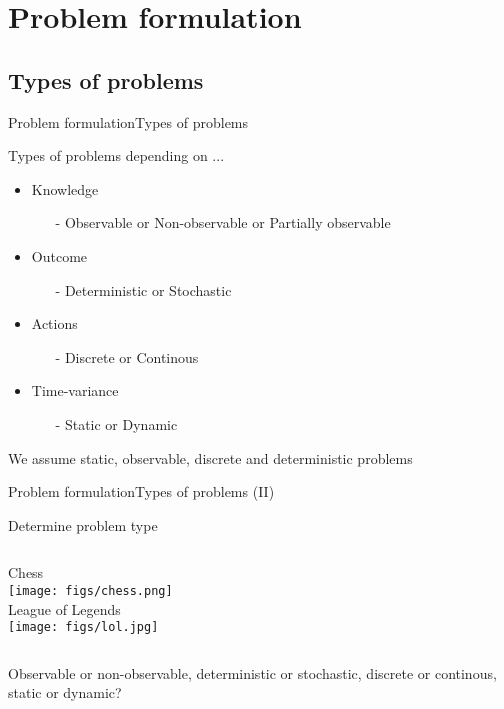 \documentclass[10pt,compress]{beamer} %
\begin{document}
\section{Problem formulation}
\subsection{Types of problems}
\begin{frame}{Problem formulation}{Types of problems}

    Types of problems depending on ...
	\begin{itemize}
        \item Knowledge
            \begin{itemize}
                \item[-] Observable or Non-observable or Partially observable
            \end{itemize}
        \item Outcome
            \begin{itemize}
                \item[-] Deterministic or Stochastic
            \end{itemize}
        \item Actions
            \begin{itemize}
                \item[-] Discrete or Continous
            \end{itemize}
        \item Time-variance
            \begin{itemize}
                \item[-] Static or Dynamic
            \end{itemize}
	\end{itemize}
    We assume static, observable, discrete and deterministic problems
\end{frame}

\begin{frame}[fragile]{Problem formulation}{Types of problems (II)}
    \begin{exampleblock}{Determine problem type}
       \begin{columns}
           \centering Chess\\
           \medskip
	        \texttt{[image: figs/chess.png]}\\

           \centering League of Legends\\
           \medskip
	        \texttt{[image: figs/lol.jpg]}\\
        \end{columns}
        \medskip
        Observable or non-observable, deterministic or stochastic, discrete or continous, static or dynamic?
    \end{exampleblock}
\end{frame}
\end{document}
